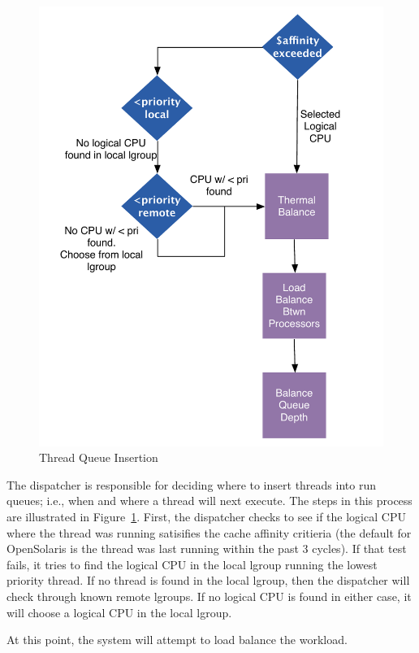 \documentclass[times,10pt,onecolumn]{article}
\begin{document}
\begin{figure}[htbp]
  \centering
  \includegraphics[scale=0.40]{threadinsert.pdf}
  \caption{Thread Queue Insertion}
  \label{fig:thread}
\end{figure}
The dispatcher is responsible for deciding where to insert threads into
run queues; i.e., when and where a thread will next execute. The steps
in this process are illustrated in Figure~\ref{fig:thread}.  First, the
dispatcher checks to see if the logical CPU where the thread was running
satisifies the cache affinity critieria (the default for OpenSolaris is
the thread was last running within the past 3 cycles).  If that test
fails, it tries to find the logical CPU in the local lgroup running the
lowest priority thread.  If no thread is found in the local lgroup, then
the dispatcher will check through known remote lgroups.  If no logical
CPU is found in either case, it will choose a logical CPU in the local
lgroup.

At this point, the system will attempt to load balance the workload.
\end{document}
